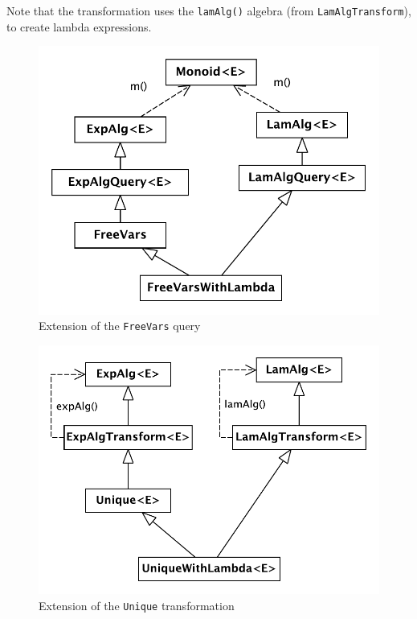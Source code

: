 
\noindent Note that the transformation uses the \lstinline{lamAlg()} algebra (from \lstinline{LamAlgTransform}),
to create lambda expressions.


\begin{figure}[t]
  \centering
  \nocaptionrule
  \includegraphics[width=0.9\linewidth]{extendQuery}
  \caption{Extension of the \lstinline{FreeVars} query }
  \label{FIG:extensionQuery}
\end{figure}


\begin{figure}[h]
  \centering
  \nocaptionrule
  \includegraphics[width=0.9\linewidth]{extendTransform}
  \caption{Extension of the \lstinline{Unique} transformation}
  \label{FIG:extensionTrafo}
\end{figure}


